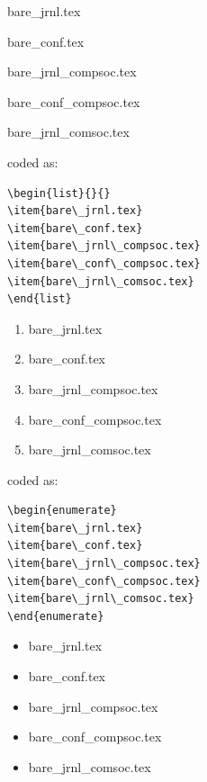 \documentclass[lettersize,journal]{IEEEtran}
\begin{document}

\begin{list}{}{}
\item{bare\_jrnl.tex}
\item{bare\_conf.tex}
\item{bare\_jrnl\_compsoc.tex}
\item{bare\_conf\_compsoc.tex}
\item{bare\_jrnl\_comsoc.tex}
\end{list}

\noindent coded as:
\begin{verbatim}
\begin{list}{}{}
\item{bare\_jrnl.tex}
\item{bare\_conf.tex}
\item{bare\_jrnl\_compsoc.tex}
\item{bare\_conf\_compsoc.tex}
\item{bare\_jrnl\_comsoc.tex}
\end{list}
\end{verbatim}

\begin{enumerate}
\item{bare\_jrnl.tex}
\item{bare\_conf.tex}
\item{bare\_jrnl\_compsoc.tex}
\item{bare\_conf\_compsoc.tex}
\item{bare\_jrnl\_comsoc.tex}
\end{enumerate}
\noindent coded as: 
\begin{verbatim}
\begin{enumerate}
\item{bare\_jrnl.tex}
\item{bare\_conf.tex}
\item{bare\_jrnl\_compsoc.tex}
\item{bare\_conf\_compsoc.tex}
\item{bare\_jrnl\_comsoc.tex}
\end{enumerate}
\end{verbatim}


\begin{itemize}
\item{bare\_jrnl.tex}
\item{bare\_conf.tex}
\item{bare\_jrnl\_compsoc.tex}
\item{bare\_conf\_compsoc.tex}
\item{bare\_jrnl\_comsoc.tex}
\end{itemize}
\end{document}
